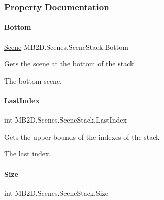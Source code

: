 \subsubsection{Property Documentation}
\hypertarget{class_m_b2_d_1_1_scenes_1_1_scene_stack_a916ab93964a454fa69697bef787c79d6}{}\label{class_m_b2_d_1_1_scenes_1_1_scene_stack_a916ab93964a454fa69697bef787c79d6} 
\paragraph{\texorpdfstring{Bottom}{Bottom}}
{\footnotesize\ttfamily \hyperlink{class_m_b2_d_1_1_scenes_1_1_scene}{Scene} M\+B2\+D.\+Scenes.\+Scene\+Stack.\+Bottom\hspace{0.3cm}{\ttfamily [get]}}



Gets the scene at the bottom of the stack. 

The bottom scene.\hypertarget{class_m_b2_d_1_1_scenes_1_1_scene_stack_a4c0fa3522458fb0d64cee1a54f31d50d}{}\label{class_m_b2_d_1_1_scenes_1_1_scene_stack_a4c0fa3522458fb0d64cee1a54f31d50d} 
\paragraph{\texorpdfstring{Last\+Index}{LastIndex}}
{\footnotesize\ttfamily int M\+B2\+D.\+Scenes.\+Scene\+Stack.\+Last\+Index\hspace{0.3cm}{\ttfamily [get]}}



Gets the upper bounds of the indexes of the stack 

The last index.\hypertarget{class_m_b2_d_1_1_scenes_1_1_scene_stack_a960aea6084b685c9cb4fce6b1a586009}{}\label{class_m_b2_d_1_1_scenes_1_1_scene_stack_a960aea6084b685c9cb4fce6b1a586009} 
\paragraph{\texorpdfstring{Size}{Size}}
{\footnotesize\ttfamily int M\+B2\+D.\+Scenes.\+Scene\+Stack.\+Size\hspace{0.3cm}{\ttfamily [get]}}



